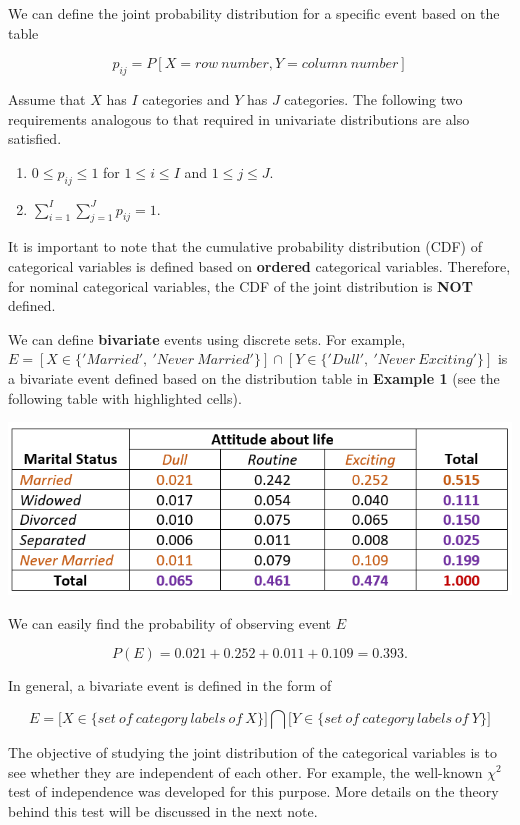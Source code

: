 \documentclass[
]{book}
\begin{document}
We can define the joint probability distribution for a specific event based on the table

\[
p_{ij} = P[X= row \ number, Y = column \ number]
\]

Assume that \(X\) has \(I\) categories and \(Y\) has \(J\) categories. The following two requirements analogous to that required in univariate distributions are also satisfied.

\begin{enumerate}
\def\labelenumi{\arabic{enumi}.}
\item
  \(0 \le p_{ij} \le 1\) for \(1 \le i \le I\) and \(1 \le j \le J\).
\item
  \(\sum_{i=1}^I \sum_{j = 1}^J p_{ij} = 1.\)
\end{enumerate}

It is important to note that the cumulative probability distribution (CDF) of categorical variables is defined based on \textbf{ordered} categorical variables. Therefore, for nominal categorical variables, the CDF of the joint distribution is \textbf{NOT} defined.

We can define \textbf{bivariate} events using discrete sets. For example, \(E = \left[ X\in\{'Married',\ 'Never \ Married'\}\right] \cap \left[Y\in\{'Dull',\ 'Never \ Exciting'\} \right]\) is a bivariate event defined based on the distribution table in \textbf{Example 1} (see the following table with highlighted cells).

\begin{center}\includegraphics[width=0.55\linewidth]{topic06/twoNominalCateJointDistEventProb} \end{center}

We can easily find the probability of observing event \(E\)

\[
P(E) = 0.021 + 0.252 + 0.011 + 0.109 = 0.393.
\]

In general, a bivariate event is defined in the form of

\[
E = \bigr[ X\in \{ set \ of \ category \ labels \ of \ X\} \bigr]\bigcap \bigr[ Y\in \{ set \ of \ category \ labels \ of \ Y\} \bigr]
\]

The objective of studying the joint distribution of the categorical variables is to see whether they are independent of each other. For example, the well-known \(\chi^2\) test of independence was developed for this purpose. More details on the theory behind this test will be discussed in the next note.
\end{document}
